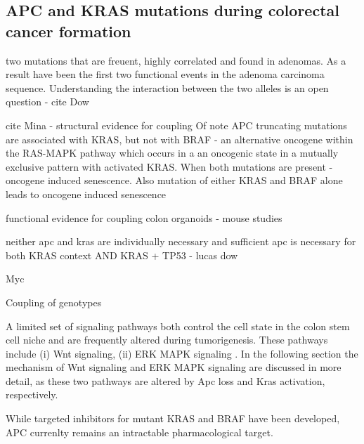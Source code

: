 \begin{flushleft}
\subsection{APC and KRAS mutations during colorectal cancer formation}
two mutations that are freuent, highly correlated and found in adenomas. As a result have been  the first two functional events in the adenoma carcinoma sequence. 
Understanding the interaction between the two alleles is an open question - cite Dow

cite Mina - structural evidence for coupling
Of note APC truncating mutations are associated with KRAS, but not with BRAF - an alternative oncogene within the RAS-MAPK pathway which occurs in a an oncogenic state in a mutually exclusive pattern with activated KRAS. When both mutations are present - oncogene induced senescence. 
Also mutation of either KRAS and BRAF alone leads to oncogene induced senescence

functional evidence for coupling
colon organoids - 
mouse studies 

neither apc and kras are individually necessary and sufficient 
apc is necessary for both KRAS context AND KRAS + TP53 - lucas dow

Myc






Coupling of genotypes

A limited set of signaling pathways both control the cell state in the colon stem cell niche and are frequently altered during tumorigenesis. These pathways include (i) Wnt signaling, (ii) ERK MAPK signaling \citep{gehartTalesCryptNew2019}. In the following section the mechanism of Wnt signaling and ERK MAPK signaling are discussed in more detail, as these two pathways are altered by Apc loss and Kras activation, respectively.


While targeted inhibitors for mutant KRAS and BRAF have been developed, APC currenlty remains an intractable pharmacological target. 


\end{flushleft}
